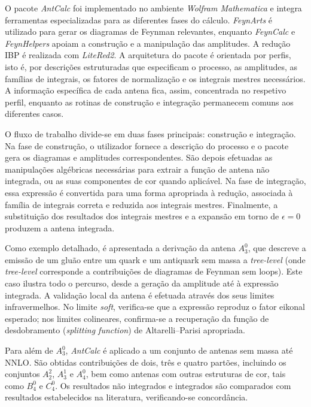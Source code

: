 O pacote \textit{AntCalc} foi implementado no ambiente \textit{Wolfram Mathematica} e integra 
ferramentas especializadas para as diferentes fases do cálculo. \textit{FeynArts} é utilizado 
para gerar os diagramas de Feynman relevantes, enquanto \textit{FeynCalc} e \textit{FeynHelpers} apoiam 
a construção e a manipulação das amplitudes. A redução IBP é realizada com \textit{LiteRed2}. 
A arquitetura do pacote é orientada por perfis, isto é, por descrições estruturadas 
que especificam o processo, as amplitudes, as famílias de integrais, os fatores de 
normalização e os integrais mestres necessários. A informação específica de cada 
antena fica, assim, concentrada no respetivo perfil, enquanto as rotinas de 
construção e integração permanecem comuns aos diferentes casos.

O fluxo de trabalho divide-se em duas fases principais: construção e integração. 
Na fase de construção, o utilizador fornece a descrição do processo e o pacote gera 
os diagramas e amplitudes correspondentes. São depois efetuadas as manipulações 
algébricas necessárias para extrair a função de antena não integrada, ou as suas 
componentes de cor quando aplicável. Na fase de integração, essa expressão é 
convertida para uma forma apropriada à redução, associada à família de integrais 
correta e reduzida aos integrais mestres. Finalmente, a substituição dos resultados 
dos integrais mestres e a expansão em torno de \(\epsilon=0\) produzem a antena 
integrada.

Como exemplo detalhado, é apresentada a derivação da antena \(A_3^0\), que descreve a
emissão de um gluão entre um quark e um antiquark sem massa a \textit{tree-level}
(onde \textit{tree-level} corresponde a contribuições de diagramas de Feynman sem
loops). Este
caso ilustra todo o percurso, desde a geração da amplitude até à expressão integrada.
A validação local da antena é efetuada através dos seus limites infravermelhos. No
limite \textit{soft}, verifica-se que a expressão reproduz o fator eikonal esperado; nos
limites colineares, confirma-se a recuperação da função de desdobramento
(\textit{splitting function}) de Altarelli–Parisi apropriada.

Para além de \(A_3^0\), \textit{AntCalc} é aplicado a um conjunto de antenas sem massa até NNLO. 
São obtidas contribuições de dois, três e quatro partões, incluindo os conjuntos 
\(A_2^2\), \(A_3^1\) e \(A_4^0\), bem como antenas com outras estruturas de cor, tais como 
\(B_4^0\) e \(C_4^0\). Os resultados não integrados e integrados são comparados com 
resultados estabelecidos na literatura, verificando-se concordância.

